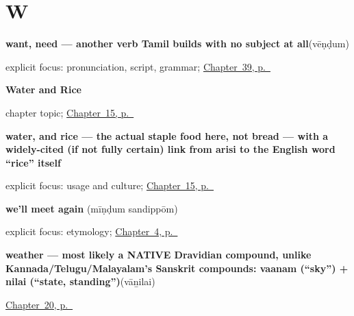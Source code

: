 \section*{W}

\noindent\begin{minipage}[t]{\linewidth}
\raggedright
\textbf{want, need — another verb Tamil builds with no subject at all}\enspace\emph{}\enspace(vēṇḍum)\par
\footnotesize explicit focus: pronunciation, script, grammar; \hyperref[ch:ta-asking-for-what-you-want]{Chapter~39, p.~\pageref*{ch:ta-asking-for-what-you-want}}
\end{minipage}\par\smallskip

\noindent\begin{minipage}[t]{\linewidth}
\raggedright
\textbf{Water and Rice}\par
\footnotesize chapter topic; \hyperref[ch:ta-water-and-rice]{Chapter~15, p.~\pageref*{ch:ta-water-and-rice}}
\end{minipage}\par\smallskip

\noindent\begin{minipage}[t]{\linewidth}
\raggedright
\textbf{water, and rice — the actual staple food here, not bread — with a widely-cited (if not fully certain) link from arisi to the English word \textquotedblleft{}rice\textquotedblright{} itself}\enspace\emph{  }\par
\footnotesize explicit focus: usage and culture; \hyperref[ch:ta-water-and-rice]{Chapter~15, p.~\pageref*{ch:ta-water-and-rice}}
\end{minipage}\par\smallskip

\noindent\begin{minipage}[t]{\linewidth}
\raggedright
\textbf{we'll meet again}\enspace\emph{ }\enspace(mīṇḍum sandippōm)\par
\footnotesize explicit focus: etymology; \hyperref[ch:farewells]{Chapter~4, p.~\pageref*{ch:farewells}}
\end{minipage}\par\smallskip

\noindent\begin{minipage}[t]{\linewidth}
\raggedright
\textbf{weather — most likely a NATIVE Dravidian compound, unlike Kannada/Telugu/Malayalam's Sanskrit compounds: vaanam (\textquotedblleft{}sky\textquotedblright{}) + nilai (\textquotedblleft{}state, standing\textquotedblright{})}\enspace\emph{}\enspace(vāṉilai)\par
\footnotesize \hyperref[ch:ta-numbers-and-weather]{Chapter~20, p.~\pageref*{ch:ta-numbers-and-weather}}
\end{minipage}\par\smallskip

